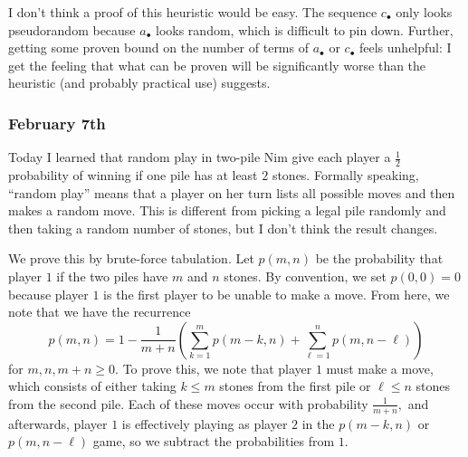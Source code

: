 I don't think a proof of this heuristic would be easy. The sequence $c_\bullet$ only looks pseudorandom because $a_\bullet$ looks random, which is difficult to pin down. Further, getting some proven bound on the number of terms of $a_\bullet$ or $c_\bullet$ feels unhelpful: I get the feeling that what can be proven will be significantly worse than the heuristic (and probably practical use) suggests.

\subsubsection{February 7th}
Today I learned that random play in two-pile Nim give each player a $\frac12$ probability of winning if one pile has at least $2$ stones. Formally speaking, ``random play'' means that a player on her turn lists all possible moves and then makes a random move. This is different from picking a legal pile randomly and then taking a random number of stones, but I don't think the result changes.

We prove this by brute-force tabulation. Let $p(m,n)$ be the probability that player $1$ if the two piles have $m$ and $n$ stones. By convention, we set $p(0,0)=0$ because player $1$ is the first player to be unable to make a move. From here, we note that we have the recurrence
\[p(m,n)=1-\frac1{m+n}\left(\sum_{k=1}^mp(m-k,n)+\sum_{\ell=1}^np(m,n-\ell)\right)\]
for $m,n,m+n\ge0.$ To prove this, we note that player $1$ must make a move, which consists of either taking $k\le m$ stones from the first pile or $\ell\le n$ stones from the second pile. Each of these moves occur with probability $\frac1{m+n},$ and afterwards, player $1$ is effectively playing as player $2$ in the $p(m-k,n)$ or $p(m,n-\ell)$ game, so we subtract the probabilities from $1.$

